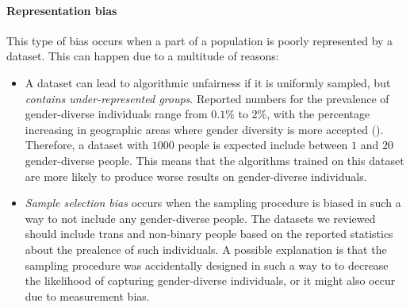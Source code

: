 \documentclass[sigconf,review,balance=false]{acmart}
\begin{document}
\paragraph*{Representation bias} This type of bias occurs when a part of a population is poorly represented by a dataset. This can happen due to a multitude of reasons:
\begin{itemize}
    \item A dataset can lead to algorithmic unfairness if it is uniformly sampled, but \emph{contains under-represented groups}. Reported numbers for the prevalence of gender-diverse individuals range from $0.1\%$ to $2\%$, with the percentage increasing in geographic areas where gender diversity is more accepted (). Therefore, a dataset with $1000$ people is expected include between $1$ and $20$ gender-diverse people. This means that the algorithms trained on this dataset are more likely to produce worse results on gender-diverse individuals.
    \item \emph{Sample selection bias} occurs when the sampling procedure is biased in such a way to not include any gender-diverse people. The datasets we reviewed should include trans and non-binary people based on the reported statistics about the prealence of such individuals. A possible explanation is that the sampling procedure was accidentally designed in such a way to to decrease the likelihood of capturing gender-diverse individuals, or it might also occur due to measurement bias.
\end{itemize}

\end{document}
